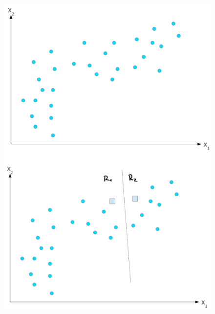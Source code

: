 \documentclass[12pt, twoside, openright]{report} %
\begin{document}
\begin{figure}[H]
  {\includegraphics[scale=.2]{2021-03-26 09_37_22-Aprendizaje basado en instancias y no supervisados.pdf - Foxit Reader.png}
  \includegraphics[scale=.2]{2021-03-26 09_38_09-Aprendizaje basado en instancias y no supervisados.pdf - Foxit Reader.png}}
\end{figure}
\end{document}
